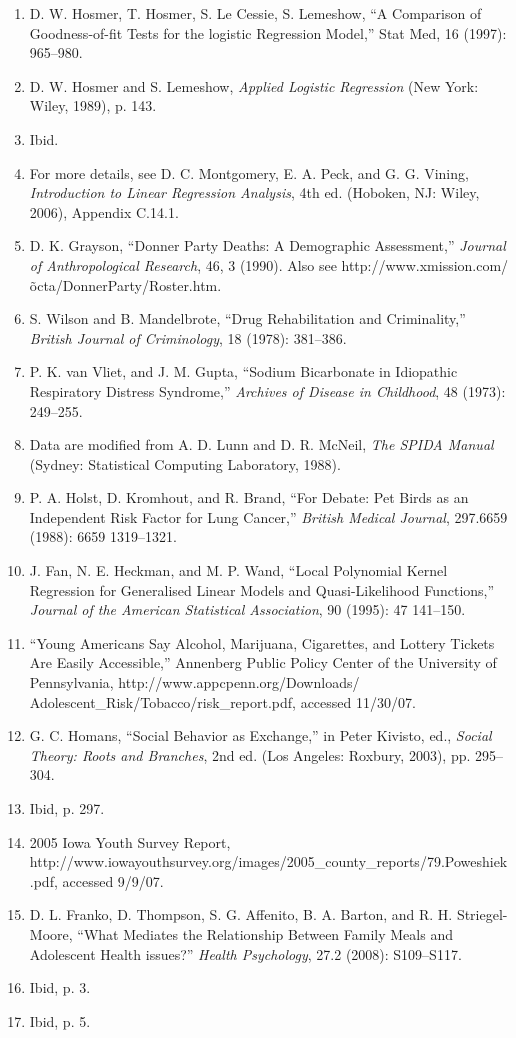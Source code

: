 \documentclass[
]{book}
\begin{document}
\begin{enumerate}
\item D. W. Hosmer, T. Hosmer, S. Le Cessie, S. Lemeshow, “A Comparison of Goodness-of-fit Tests for the logistic Regression Model,” Stat Med, 16 (1997): 965–980.
\item D. W. Hosmer and S. Lemeshow, \textit{Applied Logistic Regression} (New York: Wiley, 1989), p. 143.
\item Ibid.
\item For more details, see D. C. Montgomery, E. A. Peck, and G. G. Vining, \textit{Introduction to Linear Regression Analysis}, 4th ed. (Hoboken, NJ: Wiley, 2006), Appendix C.14.1.
\item D. K. Grayson, “Donner Party Deaths: A Demographic Assessment,” \textit{Journal of Anthropological Research}, 46, 3 (1990). Also see http://www.xmission.com/\~octa/DonnerParty/Roster.htm.
\item S. Wilson and B. Mandelbrote, “Drug Rehabilitation and Criminality,” \textit{British Journal of Criminology}, 18 (1978): 381–386.
\item P. K. van Vliet, and J. M. Gupta, “Sodium Bicarbonate in Idiopathic Respiratory Distress Syndrome,” \textit{Archives of Disease in Childhood}, 48 (1973): 249–255.
\item Data are modified from A. D. Lunn and D. R. McNeil, \textit{The SPIDA Manual} (Sydney: Statistical Computing Laboratory, 1988).
\item P. A. Holst, D. Kromhout, and R. Brand, “For Debate: Pet Birds as an Independent Risk Factor for Lung Cancer,” \textit{British Medical Journal}, 297.6659 (1988): 6659 1319–1321.
\item J. Fan, N. E. Heckman, and M. P. Wand, “Local Polynomial Kernel Regression for Generalised Linear Models and Quasi-Likelihood Functions,” \textit{Journal of the American Statistical Association}, 90 (1995): 47 141–150.
\item “Young Americans Say Alcohol, Marijuana, Cigarettes, and Lottery Tickets Are Easily Accessible,” Annenberg Public Policy Center of the University of Pennsylvania, http://www.appcpenn.org/Downloads/
Adolescent\_Risk/Tobacco/risk\_report.pdf, accessed 11/30/07.
\item G. C. Homans, “Social Behavior as Exchange,” in Peter Kivisto, ed., \textit{Social Theory: Roots and Branches}, 2nd ed. (Los Angeles: Roxbury, 2003), pp. 295–304.
\item Ibid, p. 297.
\item 2005 Iowa Youth Survey Report, http://www.iowayouthsurvey.org/images/2005\_county\_reports/79.Poweshiek.pdf, accessed 9/9/07.
\item D. L. Franko, D. Thompson, S. G. Affenito, B. A. Barton, and R. H. Striegel-Moore, “What Mediates the Relationship Between Family Meals and Adolescent Health issues?” \textit{Health Psychology}, 27.2 (2008): S109–S117.
\item Ibid, p. 3.
\item Ibid, p. 5.

\end{enumerate}
\end{document}
